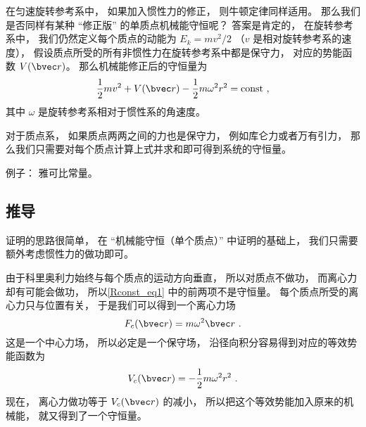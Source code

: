 

在匀速旋转参考系中， 如果加入惯性力的修正， 则牛顿定律同样适用。 那么我们是否同样有某种 “修正版” 的单质点机械能守恒呢？ 答案是肯定的， 在旋转参考系中， 我们仍然定义每个质点的动能为 $E_k = mv^2/2$ （$v$ 是相对旋转参考系的速度）， 假设质点所受的所有非惯性力在旋转参考系中都是保守力， 对应的势能函数 $V(\bvec r)$。 那么机械能修正后的守恒量为
\begin{equation}\label{Rconst_eq1}
\frac{1}{2}m v^2 + V(\bvec r) - \frac{1}{2}m\omega^2 r^2 = \text{const}~,
\end{equation}
其中 $\omega$ 是旋转参考系相对于惯性系的角速度。

对于质点系， 如果质点两两之间的力也是保守力， 例如库仑力或者万有引力， 那么我们只需要对每个质点计算上式并求和即可得到系统的守恒量。

例子： 雅可比常量。

\subsection{推导}
证明的思路很简单， 在 “机械能守恒（单个质点）” 中证明的基础上， 我们只需要额外考虑惯性力的做功即可。

由于科里奥利力始终与每个质点的运动方向垂直， 所以对质点不做功， 而离心力却有可能会做功， 所以\autoref{Rconst_eq1} 中的前两项不是守恒量。 每个质点所受的离心力只与位置有关， 于是我们可以得到一个离心力场
\begin{equation}
F_c(\bvec r) = m\omega^2 \bvec r~.
\end{equation}
 这是一个中心力场， 所以必定是一个保守场， 沿径向积分容易得到对应的等效势能函数为
\begin{equation}
V_c(\bvec r) = -\frac{1}{2}m\omega^2 r^2~.
\end{equation}
现在， 离心力做功等于 $V_c(\bvec r)$ 的减小， 所以把这个等效势能加入原来的机械能， 就又得到了一个守恒量。
